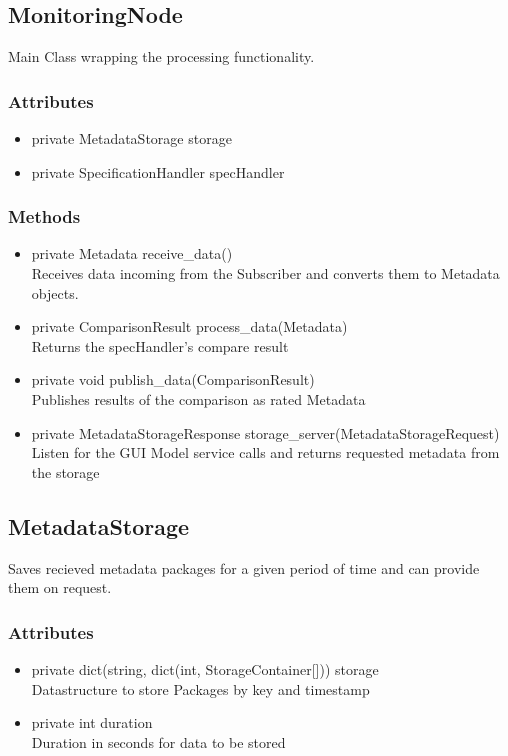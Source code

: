 
\subsection{MonitoringNode}
Main Class wrapping the processing functionality.

\subsubsection{Attributes}
\begin{itemize}
	\item private MetadataStorage storage
	\item private SpecificationHandler specHandler
\end{itemize}
\subsubsection{Methods}
\begin{itemize}
	\item private Metadata receive\_data()\\
	Receives data incoming from the Subscriber and converts them to Metadata objects.
	\item private ComparisonResult process\_data(Metadata)\\
	Returns the specHandler's compare result
	\item private void publish\_data(ComparisonResult)\\
	Publishes results of the comparison as rated Metadata
	\item private MetadataStorageResponse storage\_server(MetadataStorageRequest)\\
	Listen for the GUI Model service calls and returns requested metadata from the storage
\end{itemize}


\subsection{MetadataStorage}
Saves recieved metadata packages for a given period of time and can provide them on request.

\subsubsection{Attributes}
\begin{itemize}
	\item private dict(string, dict(int, StorageContainer[])) storage\\
	Datastructure to store Packages by key and timestamp
	\item private int duration\\
	Duration in seconds for data to be stored
\end{itemize}

